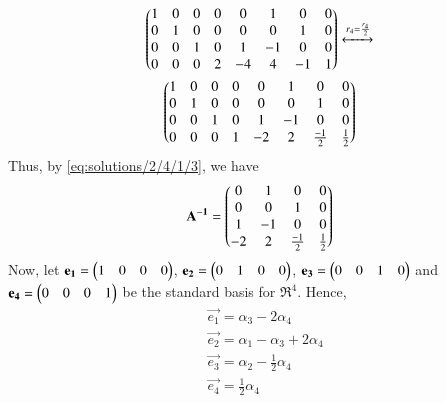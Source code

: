 \begin{multline}
\begin{pmatrix}1 & 0 & 0 & 0& 0 &1 &0 & 0 \\0 & 1 & 0 & 0& 0 &0 &1 &0 \\ 0 & 0 & 1 & 0& 1&-1 &0&0  \\ 0 & 0 & 0 & 2& -4 & 4& -1 &1\end{pmatrix} \xleftrightarrow[]{r_4 = \frac{r_4}{2}} \\
\begin{pmatrix}1 & 0 & 0 & 0& 0 &1 &0 & 0 \\0 & 1 & 0 & 0& 0 &0 &1 &0 \\ 0 & 0 & 1 & 0& 1&-1 &0&0  \\ 0 & 0 & 0 & 1& -2 & 2& \frac{-1}{2} & \frac{1}{2}\end{pmatrix}	\label{eq:solutions/2/4/1/3}
\end{multline}
Thus, by \eqref{eq:solutions/2/4/1/3}, we have
\begin{align}
	\mathbf{A^{-1}}= \begin{pmatrix}0 & 1 & 0 & 0 \\ 0 & 0 & 1 & 0 \\ 1 & -1 & 0 & 0 \\ -2 & 2 & \frac{-1}{2} & \frac{1}{2}\end{pmatrix}
\end{align}
Now, let $\mathbf{e_1} = \begin{pmatrix}1 & 0 & 0 & 0\end{pmatrix}$, $\mathbf{e_2} = \begin{pmatrix}0 & 1 & 0 & 0\end{pmatrix}$, $\mathbf{e_3} = \begin{pmatrix}0 & 0 & 1 & 0\end{pmatrix}$ and $\mathbf{e_4} = \begin{pmatrix}0 & 0 & 0 & 1\end{pmatrix}$ be the standard basis for $\Re^4$. Hence,
\begin{align}
& \vec{e_1} = \alpha_3 - 2 \alpha_4 \\ 
& \vec{e_2} = \alpha_1 - \alpha_3 + 2\alpha_4 \\
& \vec{e_3} = \alpha_2 - \frac{1}{2} \alpha_4 \\
& \vec{e_4} = \frac{1}{2}\alpha_4
\end{align}
